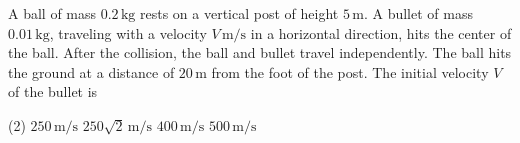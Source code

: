
\item A ball of mass \(0.2\, \text{kg}\) rests on a vertical post of height \(5\, \text{m}\). A bullet of mass \(0.01\, \text{kg}\), traveling with a velocity \(V\, \text{m/s}\) in a horizontal direction, hits the center of the ball. After the collision, the ball and bullet travel independently. The ball hits the ground at a distance of \(20\, \text{m}\) from the foot of the post. The initial velocity \(V\) of the bullet is
    \begin{center}
    \end{center}
    \begin{tasks}(2)
        \task \(250\, \text{m/s}\)
        \task \(250\sqrt{2}\, \text{m/s}\)
        \task \(400\, \text{m/s}\)
        \task \(500\, \text{m/s}\)
    \end{tasks}
